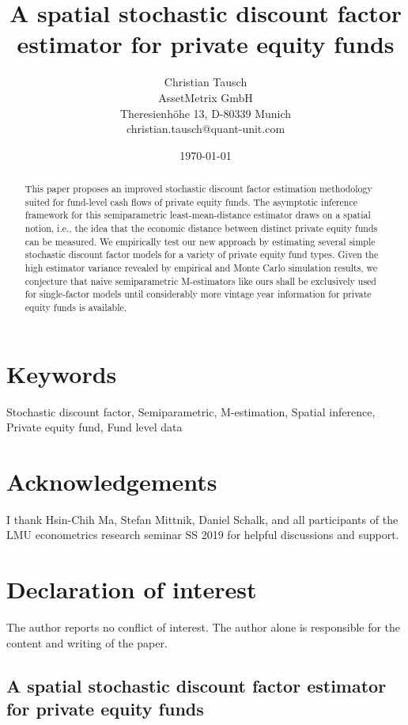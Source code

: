 \documentclass[12pt]{article}
\title{A spatial stochastic discount factor estimator for private equity funds}
\author{
	Christian Tausch  \\
	AssetMetrix GmbH  \\
	Theresienh\"{o}he 13, D-80339 Munich \\
	christian.tausch@quant-unit.com \\
	}
\date{\today}
\begin{document}
\maketitle


\section*{Keywords}
Stochastic discount factor, Semiparametric, M-estimation, Spatial inference, Private equity fund, Fund level data


\section*{Acknowledgements}
I thank Hsin-Chih Ma, Stefan Mittnik, Daniel Schalk, and all participants of the LMU econometrics research seminar SS 2019 for helpful discussions and support.


\section*{Declaration of interest}
The author reports no conflict of interest. 
The author alone is responsible for the content and writing of the paper.


\newpage

\begin{center} 
\section*{A spatial stochastic discount factor estimator for private equity funds}
\end{center}



\begin{abstract}
This paper proposes an improved stochastic discount factor estimation methodology suited for fund-level cash flows of private equity funds.
The asymptotic inference framework for this semiparametric least-mean-distance estimator draws on a spatial notion, i.e., the idea that the economic distance between distinct private equity funds can be measured.
We empirically test our new approach by estimating several simple stochastic discount factor models for a variety of private equity fund types.
Given the high estimator variance revealed by empirical and Monte Carlo simulation results, we conjecture that naive semiparametric M-estimators like ours shall be exclusively used for single-factor models until considerably more vintage year information for private equity funds is available.
\end{abstract}
\end{document}
